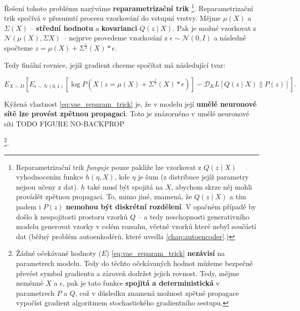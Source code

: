 Řešení tohoto problému nazýváme \textbf{reparametrizační trik}
\footnote{Reparametrizační trik \emph{funguje} pouze pakliže lze vzorkovat z $Q(z\mid X)$ vyhodnocením funkce $h(\eta, X)$, kde $\eta$ je šum (z distribuce jejíž parametry nejsou učeny z dat). $h$ také musí být spojitá na $X$, abychom skrze něj mohli provádět zpětnou propagaci.
To, mimo jiné, znamená, že $Q(z\mid X)$ a tím padem i $P(z)$ \textbf{nemohou být diskrétní rozdělení}. V opačném případě by došlo k nespojitosti prostoru vzorků $Q$ – a tedy neschopnosti generativního modelu generovat vzorky v celém rozsahu, včetně vzorků které nebyl součástí dat (běžný problém autoenkodérů, které uvedla \autoref{chap:autoencoder}.)}.
Reparametrizační trik spočívá v přesunutí procesu vzorkování do vstupní vrstvy.
Mějme $\mu(X)$ a $\Sigma(X)$ – \textbf{střední hodnotu} a \textbf{kovarianci} $Q(z\mid X)$.
Pak je možné vzorkovat z $\mathcal{N}(\mu(X), \Sigma{X})$ – nejprve provedeme vzorkování z $\epsilon \sim \mathcal{N}(0, I)$ a následně spočteme $z = \mu(X) + \Sigma^{\frac{1}{2}}(X) * \epsilon$.

Tedy finální rovnice, jejíž gradient chceme spočítat má následující tvar:

\begin{equation} \label{eq:vae_reparam_trick}
    E_{X \sim D} \left[ E_{\epsilon \sim \mathcal{N}(0, 1)} \left[ \log P(X\mid z = \mu(X) + \Sigma^{\frac{1}{2}} (X) * \epsilon) \right] - \mathcal{D}_KL \left[ Q (z \mid X) \parallel P(z) \right] \right].
\end{equation}

Kýžená vlastnost \autoref{eq:vae_reparam_trick} je, že v modelu její \textbf{umělé neuronové sítě lze provést zpětnou propagaci}. 
Toto je znázorněno v umělé neuronové síti TODO FIGURE NO-BACKPROP 

\footnote{Žádné očekávané hodnoty ($E$) \autoref{eq:vae_reparam_trick} \textbf{nezávisí} na parametrech modelu. Tedy do těchto očekávaných hodnot můžeme bezpečně převést symbol gradientu a zároveň dodržet jejich rovnost. 
Tedy, mějme neměnné $X$ a $\epsilon$, pak je tato funkce \textbf{spojitá a deterministická} v parametrech $P$ a $Q$, což v důsledku znamená možnost zpětné propagace vypočíst gradient algoritmem stochastického gradientního sestupu. }. 